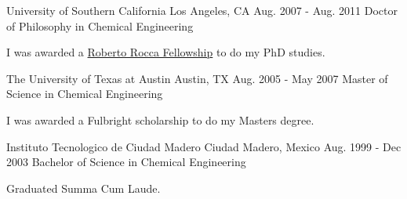 

\begin{cventries}

  \cventry
    {University of Southern California} %
    {Los Angeles, CA} %
    {Aug. 2007 - Aug. 2011} %
    {Doctor of Philosophy in Chemical Engineering} %
    {
      \begin{cvitems} %
        \item  I was awarded a {\href{http://www.robertorocca.org/en/fellowships/fellows07.aspx}{Roberto Rocca Fellowship}} to do my PhD studies.
      \end{cvitems}
    }

  \cventry
      {The University of Texas at Austin} %
      {Austin, TX} %
      {Aug. 2005 - May 2007} %
      {Master of Science in Chemical Engineering} %
      {
        \begin{cvitems} %
          \item  I was awarded a Fulbright scholarship to do my Masters degree.
        \end{cvitems}
      }

  \cventry
      {Instituto Tecnologico de Ciudad Madero} %
      {Ciudad Madero, Mexico} %
      {Aug. 1999 - Dec 2003} %
      {Bachelor of Science in Chemical Engineering} %
      {
       \begin{cvitems} %
          \item  Graduated Summa Cum Laude.
        \end{cvitems}
      }




\end{cventries}
